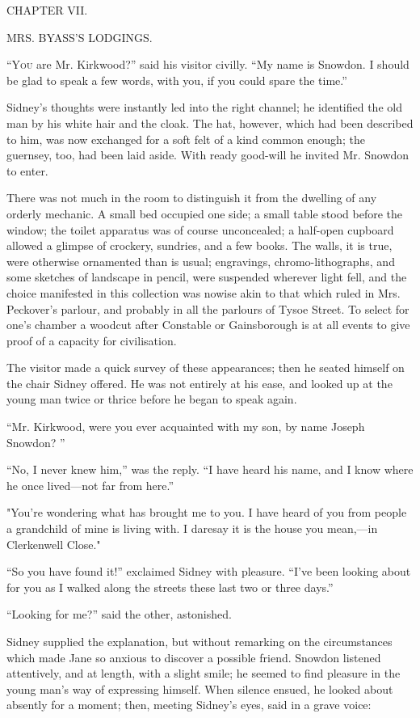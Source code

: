 {}

{CHAPTER VII.}

MRS. BYASS'S LODGINGS.

\textsc{``You} are Mr. Kirkwood?'' said his visitor civilly. ``My name
is Snowdon. I should be glad to speak a few words, with you, if you
could spare the time.''

Sidney's thoughts were instantly led into the right channel; he
identified the old man by his white hair and the cloak. The hat,
however, which had been described to him, was now exchanged for a soft
felt of a kind common enough; the guernsey, too, had been laid aside.
With ready good-will he invited Mr. Snowdon to enter.

There was not much in the room to distinguish it from the dwelling of
any orderly mechanic. A small bed occupied one side; a small table stood
before the window; the toilet apparatus was of course unconcealed; {}a
half-open cupboard allowed a glimpse of crockery, sundries, and a few
books. The walls, it is true, were otherwise ornamented than is usual;
engravings, chromo-lithographs, and some sketches of landscape in
pencil, were suspended wherever light fell, and the choice manifested in
this collection was nowise akin to that which ruled in Mrs. Peckover's
parlour, and probably in all the parlours of Tysoe Street. To select for
one's chamber a woodcut after Constable or Gainsborough is at all events
to give proof of a capacity for civilisation.

The visitor made a quick survey of these appearances; then he seated
himself on the chair Sidney offered. He was not entirely at his ease,
and looked up at the young man twice or thrice before he began to speak
again.

``Mr. Kirkwood, were you ever acquainted with my son, by name Joseph
Snowdon? ''

``No, I never knew him,'' was the reply. ``I have heard his name, and I
know where he once lived---not far from here.''

"You're wondering what has brought me {}to you. I have heard of you from
people a grandchild of mine is living with. I daresay it is the house
you mean,---in Clerkenwell Close."

``So you have found it!'' exclaimed Sidney with pleasure. ``I've been
looking about for you as I walked along the streets these last two or
three days.''

``Looking for me?'' said the other, astonished.

Sidney supplied the explanation, but without remarking on the
circumstances which made Jane so anxious to discover a possible friend.
Snowdon listened attentively, and at length, with a slight smile; he
seemed to find pleasure in the young man's way of expressing himself.
When silence ensued, he looked about absently for a moment; then,
meeting Sidney's eyes, said in a grave voice:

